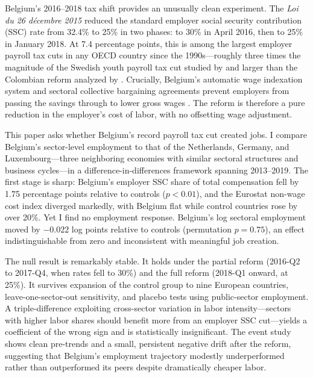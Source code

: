 \documentclass[12pt]{article}
\begin{document}
Belgium's 2016--2018 tax shift provides an unusually clean experiment. The \textit{Loi du 26 d\'{e}cembre 2015} reduced the standard employer social security contribution (SSC) rate from 32.4\% to 25\% in two phases: to 30\% in April 2016, then to 25\% in January 2018. At 7.4 percentage points, this is among the largest employer payroll tax cuts in any OECD country since the 1990s---roughly three times the magnitude of the Swedish youth payroll tax cut studied by \citet{saezetal2019} and larger than the Colombian reform analyzed by \citet{kuglerkugler2009}. Crucially, Belgium's automatic wage indexation system and sectoral collective bargaining agreements prevent employers from passing the savings through to lower gross wages \citep{dolsetal2020, calmforsdriffill1988}. The reform is therefore a pure reduction in the employer's cost of labor, with no offsetting wage adjustment.

This paper asks whether Belgium's record payroll tax cut created jobs. I compare Belgium's sector-level employment to that of the Netherlands, Germany, and Luxembourg---three neighboring economies with similar sectoral structures and business cycles---in a difference-in-differences framework spanning 2013--2019. The first stage is sharp: Belgium's employer SSC share of total compensation fell by 1.75 percentage points relative to controls ($p < 0.01$), and the Eurostat non-wage cost index diverged markedly, with Belgium flat while control countries rose by over 20\%. Yet I find no employment response. Belgium's log sectoral employment moved by $-0.022$ log points relative to controls (permutation $p = 0.75$), an effect indistinguishable from zero and inconsistent with meaningful job creation.

The null result is remarkably stable. It holds under the partial reform (2016-Q2 to 2017-Q4, when rates fell to 30\%) and the full reform (2018-Q1 onward, at 25\%). It survives expansion of the control group to nine European countries, leave-one-sector-out sensitivity, and placebo tests using public-sector employment. A triple-difference exploiting cross-sector variation in labor intensity---sectors with higher labor shares should benefit more from an employer SSC cut---yields a coefficient of the wrong sign and is statistically insignificant. The event study shows clean pre-trends and a small, persistent negative drift after the reform, suggesting that Belgium's employment trajectory modestly underperformed rather than outperformed its peers despite dramatically cheaper labor.
\end{document}
